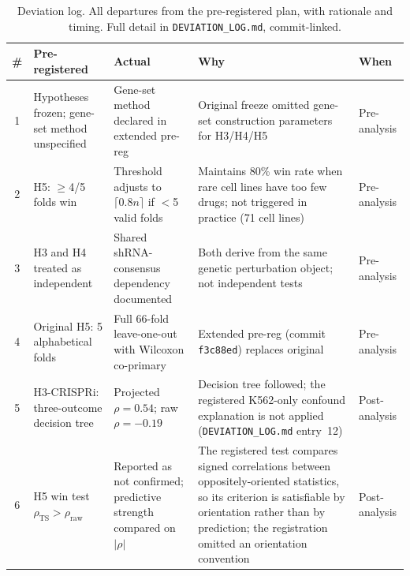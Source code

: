 \documentclass[11pt]{article}
\begin{document}
\begin{table}[t]
\centering
\caption{Deviation log. All departures from the pre-registered plan, with
rationale and timing. Full detail in \texttt{DEVIATION\_LOG.md},
commit-linked.}
\label{tab:deviations}
\small
\begin{tabular}{cp{3.2cm}p{3.2cm}p{3.8cm}l}
\toprule
\# & Pre-registered & Actual & Why & When \\
\midrule
1 & Hypotheses frozen; gene-set method unspecified &
  Gene-set method declared in extended pre-reg &
  Original freeze omitted gene-set construction parameters for H3/H4/H5 &
  Pre-analysis \\
2 & H5: $\geq$4/5 folds win &
  Threshold adjusts to $\lceil 0.8 n \rceil$ if $<$5 valid folds &
  Maintains 80\% win rate when rare cell lines have too few drugs;
  not triggered in practice (71 cell lines) &
  Pre-analysis \\
3 & H3 and H4 treated as independent &
  Shared shRNA-consensus dependency documented &
  Both derive from the same genetic perturbation object; not independent tests &
  Pre-analysis \\
4 & Original H5: 5 alphabetical folds &
  Full 66-fold leave-one-out with Wilcoxon co-primary &
  Extended pre-reg (commit \texttt{f3c88ed}) replaces original &
  Pre-analysis \\
5 & H3-CRISPRi: three-outcome decision tree &
  Projected $\rho = 0.54$; raw $\rho = -0.19$ &
  Decision tree followed; the registered K562-only confound explanation
  is not applied (\texttt{DEVIATION\_LOG.md} entry~12) &
  Post-analysis \\
6 & H5 win test $\rho_{\text{TS}} > \rho_{\text{raw}}$ &
  Reported as not confirmed; predictive strength compared on $|\rho|$ &
  The registered test compares signed correlations between
  oppositely-oriented statistics, so its criterion is satisfiable by
  orientation rather than by prediction; the registration omitted an
  orientation convention &
  Post-analysis \\
\bottomrule
\end{tabular}
\end{table}
\end{document}
